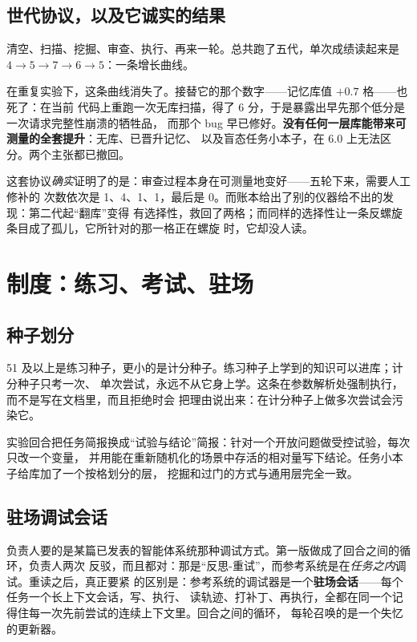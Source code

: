 \documentclass[11pt,a4paper,UTF8,fontset=macnew]{ctexrep}
\begin{document}
\section{世代协议，以及它诚实的结果}

清空、扫描、挖掘、审查、执行、再来一轮。总共跑了五代，单次成绩读起来是
$4 \to 5 \to 7 \to 6 \to 5$：一条增长曲线。

\begin{caution}[title={曲线死了，接替它的数字也死了}]
在重复实验下，这条曲线消失了。接替它的那个数字——记忆库值 $+0.7$ 格——也死了：在当前
代码上重跑一次无库扫描，得了 6 分，于是暴露出早先那个低分是一次请求完整性崩溃的牺牲品，
而那个 bug 早已修好。\textbf{没有任何一层库能带来可测量的全套提升}：无库、已晋升记忆、
以及盲态任务小本子，在 6.0 上无法区分。两个主张都已撤回。
\end{caution}

\noindent
这套协议\emph{确实}证明了的是：审查过程本身在可测量地变好——五轮下来，需要人工修补的
次数依次是 1、4、1、1，最后是 0。而账本给出了别的仪器给不出的发现：第二代起“翻库”变得
有选择性，救回了两格；而同样的选择性让一条反螺旋条目成了孤儿，它所针对的那一格正在螺旋
时，它却没人读。

\chapter{制度：练习、考试、驻场}

\section{种子划分}

51 及以上是练习种子，更小的是计分种子。练习种子上学到的知识可以进库；计分种子只考一次、
单次尝试，永远不从它身上学。这条在参数解析处强制执行，而不是写在文档里，而且拒绝时会
把理由说出来：在计分种子上做多次尝试会污染它。

实验回合把任务简报换成“试验与结论”简报：针对一个开放问题做受控试验，每次只改一个变量，
并用能在重新随机化的场景中存活的相对量写下结论。任务小本子给库加了一个按格划分的层，
挖掘和过门的方式与通用层完全一致。

\section{驻场调试会话}

负责人要的是某篇已发表的智能体系统那种调试方式。第一版做成了回合之间的循环，负责人两次
反驳，而且都对：那是“反思-重试”，而参考系统是在\emph{任务之内}调试。重读之后，真正要紧
的区别是：参考系统的调试器是一个\textbf{驻场会话}——每个任务一个长上下文会话，写、执行、
读轨迹、打补丁、再执行，全都在同一个记得住每一次先前尝试的连续上下文里。回合之间的循环，
每轮召唤的是一个失忆的更新器。
\end{document}
